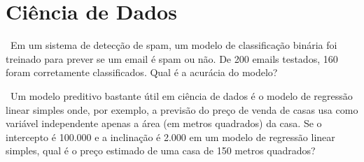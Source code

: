 \documentclass[a4paper,12pt,oneside,onecolumn]{Config/milktest}
\begin{document}

\section*{Ciência de Dados}


\question \  Em um sistema de detecção de spam, um modelo de classificação binária foi treinado para prever se um email é spam ou não. De 200 emails testados, 160 foram corretamente classificados. Qual é a acurácia do modelo?


\bigskip


\question \ Um modelo preditivo bastante útil em ciência de dados é o modelo de regressão linear simples onde, por exemplo,  a previsão do preço de venda de casas usa como variável independente apenas a área (em metros quadrados) da casa. Se o intercepto é 100.000 e a inclinação é 2.000 em um modelo de regressão linear simples, qual é o preço estimado de uma casa de 150 metros quadrados?







\end{document}
